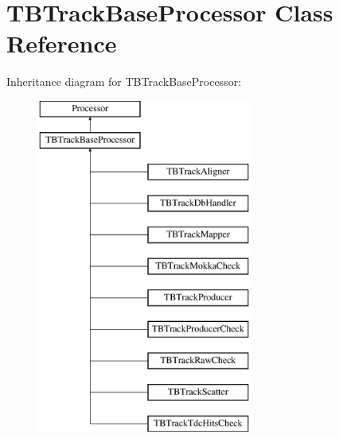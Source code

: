 \section{T\-B\-Track\-Base\-Processor Class Reference}
\label{classTBTrackBaseProcessor}
Inheritance diagram for T\-B\-Track\-Base\-Processor\-:\begin{figure}[H]
\begin{center}
\leavevmode
\includegraphics[height=11.000000cm]{classTBTrackBaseProcessor}
\end{center}
\end{figure}
